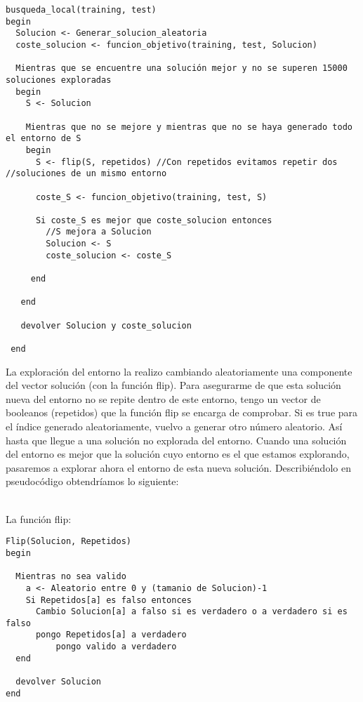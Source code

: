 	\begin{lstlisting}
busqueda_local(training, test)
begin
  Solucion <- Generar_solucion_aleatoria
  coste_solucion <- funcion_objetivo(training, test, Solucion)
  
  Mientras que se encuentre una solución mejor y no se superen 15000 soluciones exploradas
  begin
    S <- Solucion
 
    Mientras que no se mejore y mientras que no se haya generado todo el entorno de S
    begin
      S <- flip(S, repetidos) //Con repetidos evitamos repetir dos 			//soluciones de un mismo entorno
      
      coste_S <- funcion_objetivo(training, test, S)
      
      Si coste_S es mejor que coste_solucion entonces
        //S mejora a Solucion
        Solucion <- S
        coste_solucion <- coste_S
        
     end
     
   end
   
   devolver Solucion y coste_solucion
   
 end
	\end{lstlisting}
	
	La exploración del entorno la realizo cambiando aleatoriamente una componente del vector solución (con la función flip). Para asegurarme de que esta solución nueva del entorno no se repite dentro de este entorno, tengo un vector de booleanos (repetidos) que la función flip se encarga de comprobar. Si es true para el índice generado aleatoriamente, vuelvo a generar otro número aleatorio. Así hasta que llegue a una solución no explorada del entorno. Cuando una solución del entorno es mejor que la solución cuyo entorno es el que estamos explorando, pasaremos a explorar ahora el entorno de esta nueva solución. Describiéndolo en pseudocódigo obtendríamos lo siguiente:
\\
\\
\newpage


La función flip:
\begin{lstlisting}
Flip(Solucion, Repetidos)
begin

  Mientras no sea valido
    a <- Aleatorio entre 0 y (tamanio de Solucion)-1
    Si Repetidos[a] es falso entonces
      Cambio Solucion[a] a falso si es verdadero o a verdadero si es falso
      pongo Repetidos[a] a verdadero
    	  pongo valido a verdadero
  end
  
  devolver Solucion
end
  
  
\end{lstlisting}

